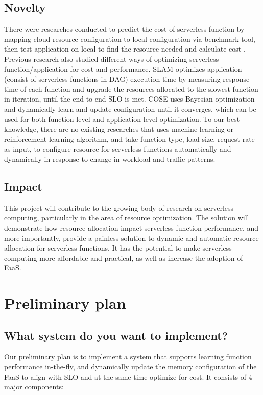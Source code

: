 \documentclass[conference]{IEEEtran}
\begin{document}
\subsection{Novelty}
There were researches conducted to predict the cost of serverless function by mapping cloud resource configuration to local configuration via benchmark tool, then test application on local to find the resource needed and calculate cost \cite{9251165}. Previous research also studied different ways of optimizing serverless function/application for cost and performance. SLAM \cite{9860980} optimizes application (consist of serverless functions in DAG) execution time by measuring response time of each function and upgrade the resources allocated to the slowest function in iteration, until the end-to-end SLO is met. COSE \cite{10063937} uses Bayesian optimization and dynamically learn and update configuration until it converges, which can be used for both function-level and application-level optimization. To our best knowledge, there are no existing researches that uses machine-learning or reinforcement learning algorithm, and take function type, load size, request rate as input, to configure resource for serverless functions automatically and dynamically in response to change in workload and traffic patterns.

\subsection{Impact}
This project will contribute to the growing body of research on serverless computing, particularly in the area of resource optimization. The solution will demonstrate how resource allocation impact serverless function performance, and more importantly, provide a painless solution to dynamic and automatic resource allocation for serverless functions. It has the potential to make serverless computing more affordable and practical, as well as increase the adoption of FaaS.

\section{Preliminary plan}
\subsection{What system do you want to implement?}

Our preliminary plan is to implement a system that supports learning function performance in-the-fly, and dynamically update the memory configuration of the FaaS to align with SLO and at the same time optimize for cost. It consists of 4 major components:
\end{document}
